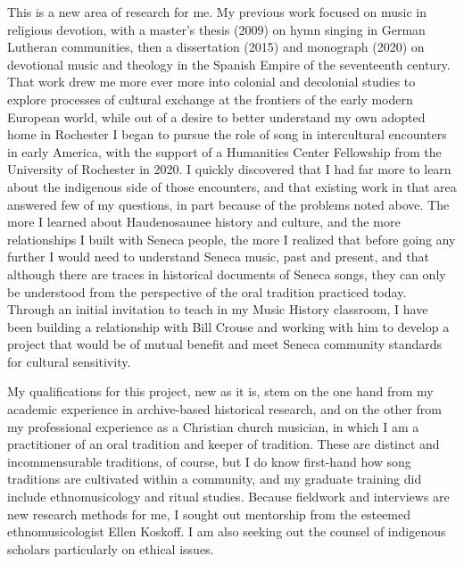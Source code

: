 \documentclass{neh}
\begin{document}
This is a new area of research for me.
My previous work focused on music in religious devotion, with a master's
thesis (2009) on hymn singing in German Lutheran communities, then a
dissertation (2015) and monograph (2020) on devotional music and theology in
the Spanish Empire of the seventeenth century. 
That work drew me more ever more into colonial and decolonial studies to
explore processes of cultural exchange at the frontiers of the early modern
European world, while out of a desire to better understand my own adopted home
in Rochester I began to pursue the role of song in intercultural encounters in
early America, with the support of a Humanities Center Fellowship from the
University of Rochester in 2020.
I quickly discovered that I had far more to learn about the indigenous side of
those encounters, and that existing work in that area answered few of my
questions, in part because of the problems noted above.
The more I learned about Haudenosaunee history and culture, and the more
relationships I built with Seneca people, the more I realized that before
going any further I would need to understand Seneca music, past and present,
and that although there are traces in historical documents of Seneca songs,
they can only be understood from the perspective of the oral tradition
practiced today.
Through an initial invitation to teach in my Music History classroom, I
have been building a relationship with Bill Crouse and working with him to
develop a project that would be of mutual benefit and meet Seneca community
standards for cultural sensitivity.

My qualifications for this project, new as it is, stem on the one hand from my 
academic experience in archive-based historical research, and on the other
from my professional experience as a Christian church musician, in which I am
a practitioner of an oral tradition and keeper of tradition.
These are distinct and incommensurable traditions, of course, but I do
know first-hand how song traditions are cultivated within a community, and my
graduate training did include ethnomusicology and ritual studies.
Because fieldwork and interviews are new research methods for me, I sought
out mentorship from the esteemed ethnomusicologist Ellen Koskoff.
I am also seeking out the counsel of indigenous scholars particularly on
ethical issues.
\end{document}
